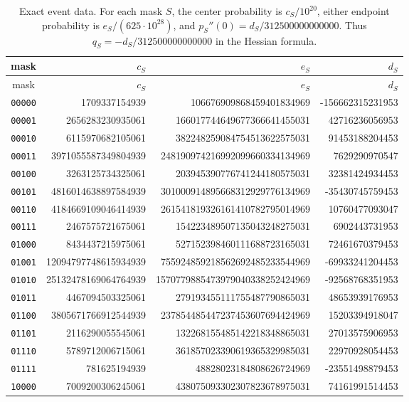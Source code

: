 \begin{longtable}{@{}c r r r@{}}
\caption{Exact event data. For each mask $S$, the center probability is $c_S/10^{20}$, either endpoint probability is $e_S/(625\cdot10^{28})$, and $p_S''(0)=d_S/312500000000000$. Thus $q_S=-d_S/312500000000000$ in the Hessian formula.}\label{tab:events}\\
\toprule
mask & $c_S$ & $e_S$ & $d_S$\\
\midrule
\endfirsthead
\toprule
mask & $c_S$ & $e_S$ & $d_S$\\
\midrule
\endhead
\texttt{00000} & 1709337154939 & 106676909868459401834969 & -156662315231953\\
\texttt{00001} & 2656283230935061 & 166017744649677366641455031 & 42716236056953\\
\texttt{00010} & 6115970682105061 & 382248259084754513622575031 & 91453188204453\\
\texttt{00011} & 3971055587349804939 & 248190974216992099660334134969 & 7629290970547\\
\texttt{00100} & 3263125734325061 & 203945390776741244180575031 & 32381424934453\\
\texttt{00101} & 4816014638897584939 & 301000914895668312929776134969 & -35430745759453\\
\texttt{00110} & 4184669109046414939 & 261541819326161410782795014969 & 10760477093047\\
\texttt{00111} & 2467575721675061 & 154223489507135043248275031 & 6902443731953\\
\texttt{01000} & 8434437215975061 & 527152398460111688723165031 & 72461670379453\\
\texttt{01001} & 12094797748615934939 & 755924859218562692485233544969 & -69933241204453\\
\texttt{01010} & 25132478169064764939 & 1570779885473979040338252424969 & -92568768351953\\
\texttt{01011} & 4467094503325061 & 279193455111755487790865031 & 48653939176953\\
\texttt{01100} & 3805671766912544939 & 237854485447237453607694424969 & 15203394918047\\
\texttt{01101} & 2116290055545061 & 132268155485142218348865031 & 27013575906953\\
\texttt{01110} & 5789712006715061 & 361857023390619365329985031 & 22970928054453\\
\texttt{01111} & 781625194939 & 48828023184808626724969 & -23551498879453\\
\texttt{10000} & 7009200306245061 & 438075093302307823678975031 & 74161991514453\\

\end{longtable}
